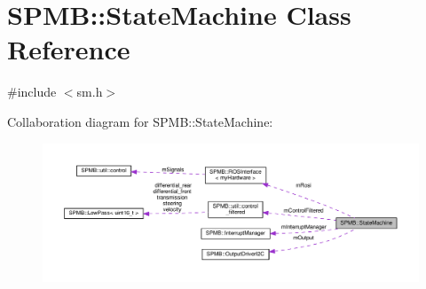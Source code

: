 \hypertarget{classSPMB_1_1StateMachine}{}\section{S\+P\+MB\+:\+:State\+Machine Class Reference}
\label{classSPMB_1_1StateMachine}


{\ttfamily \#include $<$sm.\+h$>$}



Collaboration diagram for S\+P\+MB\+:\+:State\+Machine\+:
\nopagebreak
\begin{figure}[H]
\begin{center}
\leavevmode
\includegraphics[width=350pt]{classSPMB_1_1StateMachine__coll__graph}
\end{center}
\end{figure}
